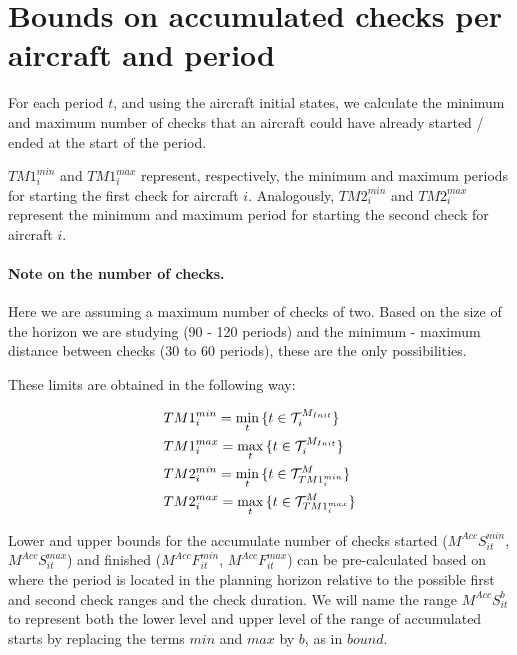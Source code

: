 \documentclass[a4paper,onecolumn,fleqn]{article}
\begin{document}
\section{Bounds on accumulated checks per aircraft and period} \label{sec:rangechecksaircraft}

  For each period $t$, and using the aircraft initial states, we calculate the minimum and maximum number of checks that an aircraft could have already started / ended at the start of the period.

  $TM1^{min}_i$ and $TM1^{max}_i$ represent, respectively, the minimum and maximum periods for starting the first check for aircraft $i$. Analogously, $TM2^{min}_i$ and $TM2^{max}_i$ represent the minimum and maximum period for starting the second check for aircraft $i$.

  \paragraph{Note on the number of checks.} Here we are assuming a maximum number of checks of two. Based on the size of the horizon we are studying (90 - 120 periods) and the minimum - maximum distance between checks (30 to 60 periods), these are the only possibilities.

  These limits are obtained in the following way:

  \begin{align}
  	& TM1^{min}_i = \min_t{\{t \in \mathcal{T}^{M_{Init}}_i\}}   \notag\\
    & TM1^{max}_i = \max_t{\{t \in \mathcal{T}^{M_{Init}}_i\}}   \notag \\
    & TM2^{min}_i = \min_t{\{t \in \mathcal{T}^M_{TM1^{min}_i}\}}\notag \\
    & TM2^{max}_i = \max_t{\{t \in \mathcal{T}^M_{TM1^{max}_i}\}}\notag %
  \end{align}

  Lower and upper bounds for the accumulate number of checks started ($M^{Acc}S^{min}_{it}$, $M^{Acc}S^{max}_{it}$) and finished ($M^{Acc}F^{min}_{it}$, $M^{Acc}F^{max}_{it}$) can be pre-calculated based on where the period is located in the planning horizon relative to the possible first and second check ranges and the check duration. We will name the range $M^{Acc}S^{b}_{it}$ to represent both the lower level and upper level of the range of accumulated starts by replacing the terms $min$ and $max$ by $b$, as in $bound$.
\end{document}
